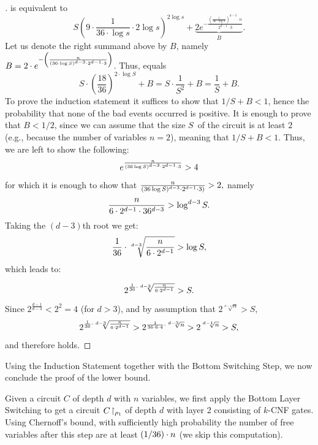 \begin{proof}[]
 is equivalent to 
\begin{equation}\label{eq:498:27}
S \left( 9 \cdot \frac{1}{36 \cdot \log s} \cdot 2 \log s \right)^{2 \log s} + 
\underbrace{2 e^{-\frac{\left(\frac{1}{36 \cdot \log S }\right)^{d-3} \cdot n}{2^{d-1} \cdot 3}}}_B.
\end{equation}Let us denote the right summand above by $B$, namely $B=2\cdot
e^{-\left(\frac{n}{{(36 \cdot \log S)^{d-3} \cdot 2^{d-1} \cdot 3}}\right)}$.  
Thus,  equals
$$
S \cdot\left(\frac{18}{36}\right)^{2 \cdot \log S}+B =S \cdot \frac{1}{S^2}+B =
\frac{1}{S}+
B.
$$
To prove the induction statement it  suffices to show that $1/S+B<1$, hence the probability that none of the bad events occurred is positive. It is enough to prove  that $B<1/2$, since we can assume that the size $S$\ of the circuit is at least $2$ (e.g., because the number of variables $n=2$), meaning that $1/S+B<1$. Thus, we are left to show the following:
\[
e^{\frac{n}{(36 \log S)^{d-3} \cdot 2^{d-1}\cdot 3}} > 4
\]
for which it is enough to show that 
$
\frac{n}{(36 \log S)^{d-3} \cdot 2^{d-1}\cdot 3)}>2,
$
namely
\[
\frac{n}{6 \cdot 2^{d-1}\cdot 36^{d-3}} > \log^{d-3} S.
\]
Taking the $(d-3)$th root we get:
\[
\frac{1}{36}\cdot \sqrt[d-3]{\frac{n}{6 \cdot 2^{d-1}}} > \log S,
\]
which leads to:

\begin{equation}\label{eq:534:30}
2^{
\frac{1}{36}\cdot \sqrt[d-3]{\frac{n}{6 \cdot 2^{d-1}}}
} >  S.
\end{equation}
Since $2^{\frac{d-1}{d-3}} < 2^2 = 4$ (for $d>3$), and by assumption that $ 2^{
\sqrt[d-1]{n}
}>S$,    
$$
2^{
\frac{1}{36}\cdot \sqrt[d-3]{\frac{n}{6 \cdot 2^{d-1}}}}>
2^{
\frac{1}{36\cdot 6\cdot 4}\cdot\sqrt[d-3]{n}
}
> 2^{
\sqrt[d-1]{n}
}>S,
$$
and therefore   holds. 

\mbox{}
\end{proof} %


Using the Induction Statement together with the Bottom Switching Step,
we now conclude the proof of the lower bound.

Given a circuit $C$ of depth $d$ with $n$ variables,
we first apply the Bottom Layer Switching to get a circuit  $C\!\upharpoonright_{\rho_1}$ of depth $d$ with layer 2 consisting of $k$-CNF gates. Using Chernoff's bound, with sufficiently high probability  the number of free variables after this step
are at least $(1/36)\cdot n$ (we skip this computation).

